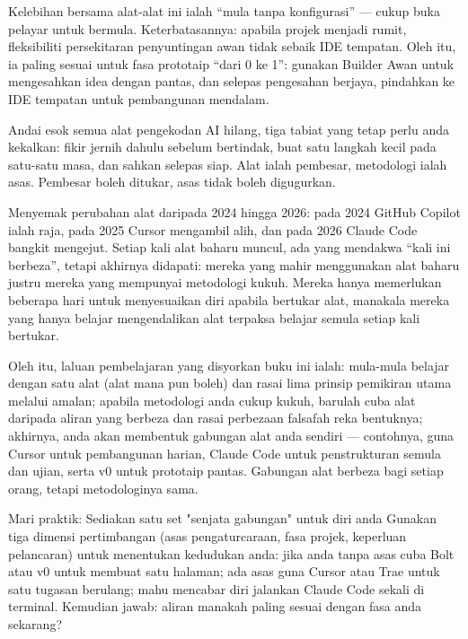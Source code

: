 Kelebihan bersama alat-alat ini ialah “mula tanpa konfigurasi” — cukup buka pelayar untuk bermula. Keterbatasannya: apabila projek menjadi rumit, fleksibiliti persekitaran penyuntingan awan tidak sebaik IDE tempatan. Oleh itu, ia paling sesuai untuk fasa prototaip “dari 0 ke 1”: gunakan Builder Awan untuk mengesahkan idea dengan pantas, dan selepas pengesahan berjaya, pindahkan ke IDE tempatan untuk pembangunan mendalam.


Andai esok semua alat pengekodan AI hilang, tiga tabiat yang tetap perlu anda kekalkan: fikir jernih dahulu sebelum bertindak, buat satu langkah kecil pada satu-satu masa, dan sahkan selepas siap. Alat ialah pembesar, metodologi ialah asas. Pembesar boleh ditukar, asas tidak boleh digugurkan.

Menyemak perubahan alat daripada 2024 hingga 2026: pada 2024 GitHub Copilot ialah raja, pada 2025 Cursor mengambil alih, dan pada 2026 Claude Code bangkit mengejut. Setiap kali alat baharu muncul, ada yang mendakwa “kali ini berbeza”, tetapi akhirnya didapati: mereka yang mahir menggunakan alat baharu justru mereka yang mempunyai metodologi kukuh. Mereka hanya memerlukan beberapa hari untuk menyesuaikan diri apabila bertukar alat, manakala mereka yang hanya belajar mengendalikan alat terpaksa belajar semula setiap kali bertukar.

Oleh itu, laluan pembelajaran yang disyorkan buku ini ialah: mula-mula belajar dengan satu alat (alat mana pun boleh) dan rasai lima prinsip pemikiran utama melalui amalan; apabila metodologi anda cukup kukuh, barulah cuba alat daripada aliran yang berbeza dan rasai perbezaan falsafah reka bentuknya; akhirnya, anda akan membentuk gabungan alat anda sendiri — contohnya, guna Cursor untuk pembangunan harian, Claude Code untuk penstrukturan semula dan ujian, serta v0 untuk prototaip pantas. Gabungan alat berbeza bagi setiap orang, tetapi metodologinya sama.

\begin{tcbpractice}{Mari praktik: Sediakan satu set "senjata gabungan" untuk diri anda}
Gunakan tiga dimensi pertimbangan (asas pengaturcaraan, fasa projek, keperluan pelancaran) untuk menentukan kedudukan anda: jika anda tanpa asas cuba Bolt atau v0 untuk membuat satu halaman; ada asas guna Cursor atau Trae untuk satu tugasan berulang; mahu mencabar diri jalankan Claude Code sekali di terminal. Kemudian jawab: aliran manakah paling sesuai dengan fasa anda sekarang?

\end{tcbpractice}

